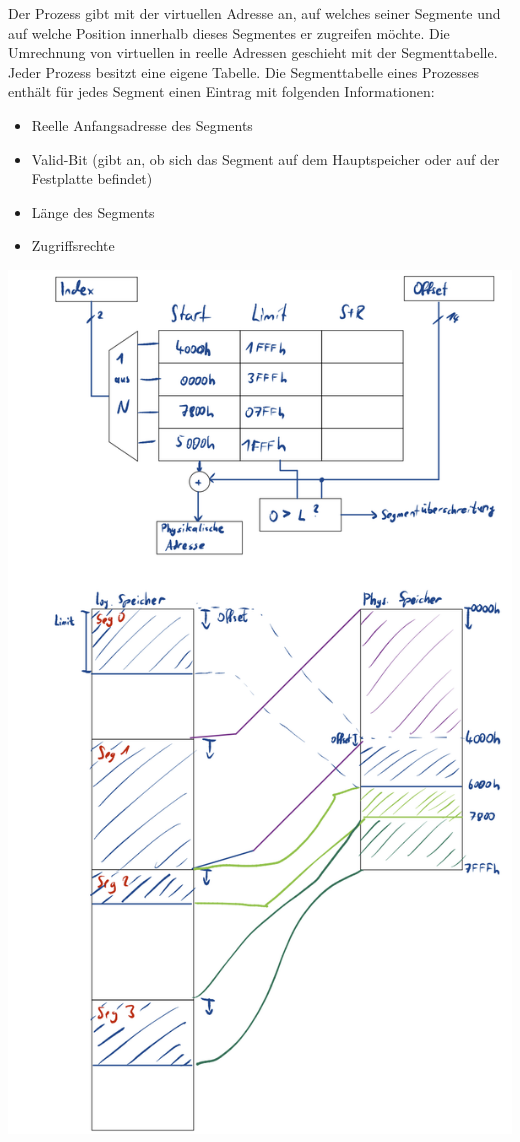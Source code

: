 \documentclass[12pt,a4paper]{article}
\begin{document}
		\newline
		Der Prozess gibt mit der virtuellen Adresse an, auf welches seiner Segmente und auf welche Position innerhalb dieses Segmentes er zugreifen möchte. Die Umrechnung von virtuellen in reelle Adressen geschieht mit der Segmenttabelle. Jeder Prozess besitzt eine eigene Tabelle. Die Segmenttabelle eines Prozesses enthält für jedes Segment einen Eintrag mit folgenden Informationen:
		\begin{itemize}
			\item Reelle Anfangsadresse des Segments 
			\item Valid-Bit (gibt an, ob sich das Segment auf dem Hauptspeicher oder auf der Festplatte befindet)
			\item Länge des Segments
			\item Zugriffsrechte
		\end{itemize}
		\includegraphics[height=\textheight]{Bilder/segmentorientiert.PNG}
		
\end{document}
